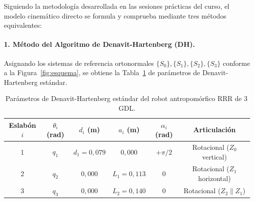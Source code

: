 \documentclass[11pt,a4paper]{article}
\begin{document}
Siguiendo la metodología desarrollada en las sesiones prácticas del curso, el modelo cinemático directo se formula y comprueba mediante tres métodos equivalentes:

\paragraph{1. Método del Algoritmo de Denavit-Hartenberg (DH).}
Asignando los sistemas de referencia ortonormales $\{S_{0}\},\{S_{1}\},\{S_{2}\},\{S_{3}\}$ conforme a la Figura~\ref{fig:esquema}, se obtiene la Tabla~\ref{tab:dh} de parámetros de Denavit-Hartenberg estándar.

\begin{table}[htbp]
\centering
\caption{Parámetros de Denavit-Hartenberg estándar del robot antropomórfico RRR de 3\,GDL.}\label{tab:dh}
\small
\begin{tabular}{cccccc}
\toprule
Eslabón $i$ & $\theta_{i}$ (rad) & $d_{i}$ (m) & $a_{i}$ (m) & $\alpha_{i}$ (rad) & Articulación \\
\midrule
1 & $q_{1}$ & $d_{1}=0{,}079$ & $0{,}000$       & $+\pi/2$ & Rotacional ($Z_{0}$ vertical) \\
2 & $q_{2}$ & $0{,}000$       & $L_{1}=0{,}113$ & $0$      & Rotacional ($Z_{1}$ horizontal) \\
3 & $q_{3}$ & $0{,}000$       & $L_{2}=0{,}140$ & $0$      & Rotacional ($Z_{2}\parallel Z_{1}$) \\
\bottomrule
\end{tabular}
\end{table}
\end{document}
